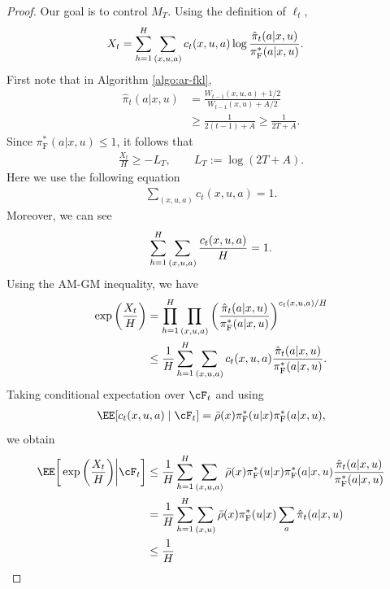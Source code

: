 \documentclass[11pt]{article}
\newcommand{\pif}{\pi_{\mathrm{F}}}
\begin{document}
\begin{proof}
Our goal is to control $M_T$. Using the
definition of $\ell_t$,
\begin{align}
\notag
    X_t
    &=
    \sum_{h=1}^H
    \sum_{(x,u,a)}
    c_t(x,u,a)
    \log
    \frac{\hat\pi_t(a|x,u)}
         {\pif^*(a|x,u)}.
\end{align}
First note that in Algorithm \ref{algo:ar-fkl},
\begin{align*}
    \hat\pi_t(a|x,u)
    &=
    \frac{W_{t-1}(x,u,a)+1/2}
         {W_{t-1}(x,u)+A/2}\\
    &\geq
    \frac{1}{2(t-1)+A}
    \geq
    \frac{1}{2T+A}.
\end{align*}
Since $\pif^*(a|x,u)\leq1$, it follows that
\begin{align}
    \frac{X_t}{H}
    \geq
    -L_T,
    \qquad
    L_T:=\log(2T+A).
\label{eq:martingale-lower-bound}
\end{align}
Here we use the following equation 
\begin{align*}
    \sum_{(x,u,a)}
    c_t(x,u,a)
    =1.
\end{align*}
Moreover, we can see
\begin{align}
    \sum_{h=1}^H
    \sum_{(x,u,a)}
    \frac{c_t(x,u,a)}{H}
    =1.
\notag
\end{align}
Using the AM-GM inequality, we have
\begin{align}
    \exp\bigg(\frac{X_t}{H}\bigg)
    &=
    \prod_{h=1}^H
    \prod_{(x,u,a)}
    \left(
        \frac{\hat\pi_t(a|x,u)}
             {\pif^*(a|x,u)}
    \right)^{c_t(x,u,a)/H}
    \notag\\
    &\leq
    \frac1H
    \sum_{h=1}^H
    \sum_{(x,u,a)}
    c_t(x,u,a)
    \frac{\hat\pi_t(a|x,u)}
         {\pif^*(a|x,u)}.
\notag
\end{align}
Taking conditional expectation over $\cF_t$ and using
\begin{align*}
    \EE[c_t(x,u,a)\mid\cF_t]
    =
    \bar\rho(x)
    \pif^*(u|x)
    \pif^*(a|x,u),
\end{align*}
we obtain
\begin{align}
    \EE\bigg[
        \exp\bigg(\frac{X_t}{H}\bigg)
        \bigg|
        \cF_t
    \bigg]
    &\leq
    \frac1H
    \sum_{h=1}^H
    \sum_{(x,u,a)}
    \bar\rho(x)\pif^*(u|x)
    \pif^*(a|x,u)
    \frac{\hat\pi_t(a|x,u)}
         {\pif^*(a|x,u)}
    \notag\\
    &=
    \frac1H
    \sum_{h=1}^H
    \sum_{(x,u)}
    \bar\rho(x)\pif^*(u|x)
    \sum_{a}
    \hat\pi_t(a|x,u)
    \notag\\
    &\leq
    \frac1H

\end{align}
\end{proof}
\end{document}
